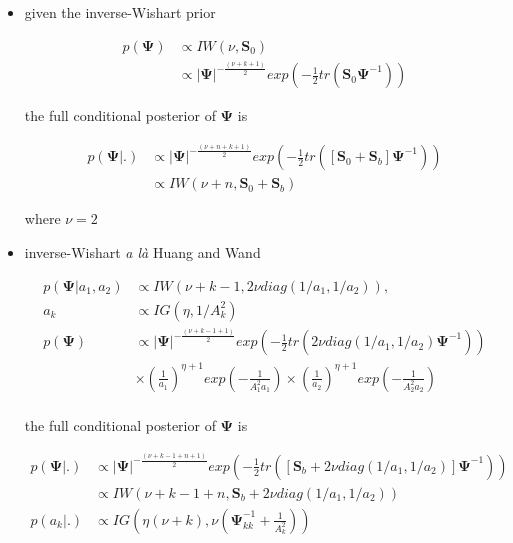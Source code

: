 \documentclass[a4paper]{article}
\begin{document}
\begin{itemize}
	\item given the inverse-Wishart prior

\begin{equation*}
 \begin{split} 
  p(\bm{\Psi})& \propto IW(\nu, \bm{S}_{0}) \\
  & \propto |\bm{\Psi}|^{-\frac{(\nu + k + 1)}{2}}exp\left(-\frac{1}{2}tr(\bm{S}_0\bm{\Psi}^{-1}) \right)
 \end{split}
\end{equation*}

the full conditional posterior of $\bm{\Psi}$ is

\begin{equation}
 \begin{split} 
  p(\bm{\Psi}|.)& \propto |\bm{\Psi}|^{-\frac{(\nu + n + k + 1)}{2}}exp\left(-\frac{1}{2}tr([\bm{S}_0+\bm{S}_b]\bm{\Psi}^{-1}) \right) \\
  & \propto IW(\nu + n, \bm{S}_{0} + \bm{S}_{b})
 \end{split}
\end{equation}	

where $\nu = 2$

	\item inverse-Wishart \textit{a là} Huang and Wand
	
\begin{equation*}
	\begin{split}
	p(\bm{\Psi}|a_1, a_2)& \propto IW(\nu + k - 1, 2\nu diag(1/a_1, 1/a_2)), \\
	a_k& \propto IG(\eta,1/A_k^2) \\
	p(\bm{\Psi})& \propto |\bm{\Psi}|^{-\frac{(\nu+k-1+1)}{2}}exp\left(-\frac{1}{2}tr(2\nu diag(1/a_1, 1/a_2)\bm{\Psi}^{-1}) \right) \\
	& \times \left(\frac{1}{a_1}\right)^{\eta+1}exp\left(-\frac{1}{A_1^2a_1}\right) \times \left(\frac{1}{a_2}\right)^{\eta+1}exp\left(-\frac{1}{A_2^2a_2}\right) \\
	\end{split}
\end{equation*}

the full conditional posterior of $\bm{\Psi}$ is

\begin{equation}
 \begin{split} 
  p(\bm{\Psi}|.)& \propto |\bm{\Psi}|^{-\frac{(\nu+k-1+n+1)}{2}}exp\left(-\frac{1}{2}tr([\bm{S}_b+2\nu diag(1/a_1, 1/a_2)]\bm{\Psi}^{-1}) \right) \\
  & \propto IW(\nu+k-1+n, \bm{S}_{b}+2\nu diag(1/a_1, 1/a_2))\\
  p(a_k|.)& \propto IG\left(\eta(\nu+k), \nu\left(\bm{\Psi}^{-1}_{kk}+\frac{1}{A_k^2}\right)\right)
 \end{split}
\end{equation}		


\end{itemize}
\end{document}
